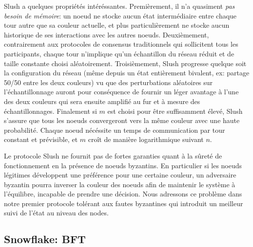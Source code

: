 \documentclass[letterpaper,twocolumn,10pt]{article}
\newcommand{\tronly}[2]{#1}
\theoremstyle{definition}
\begin{document}
Slush a quelques propriétés intéréssantes. Premièrement, il n'a quasiment \emph{pas besoin de mémoire}: un noeud ne
stocke aucun état intermédiaire entre chaque tour autre que sa couleur actuelle, et plus particulièrement ne stocke
aucun historique de ses interactions avec les autres noeuds. Deuxièmement, contrairement aux protocoles de consensus
traditionnels qui sollicitent tous les participants, chaque tour n'implique qu'un échantillon du réseau réduit et de
taille constante choisi aléatoirement. Troisièmement, Slush progresse quelque soit la configuration du réseau (même
depuis un état entièrement bivalent, ex: partage 50/50 entre les deux couleurs) vu que des perturbations aléatoires
sur l'échantillonnage auront pour conséquence de fournir un léger avantage à l'une des deux couleurs qui sera ensuite
amplifié au fur et à mesure des échantillonnages.
Finalement si $m$ est choisi pour être suffisamment élevé, Slush s'assure que tous les noeuds convergeront vers la
même couleur avec une haute probabilité. Chaque noeud nécéssite un temps de communication par tour constant et
prévisible, et $m$ croît de manière logarithmique suivant $n$.

\tronly{

Le protocole Slush ne fournit pas de fortes garanties quant à la sûreté de fonctionnement en la présence de noeuds
byzantins. En particulier si les noeuds légitimes développent une préférence pour une certaine couleur, un adversaire
byzantin pourra inverser la couleur des noeuds afin de maintenir le système à l'équilibre, incapable de prendre une
décision. Nous adressons ce problème dans notre premier protocole tolérant aux fautes byzantines qui introduit un
meilleur suivi de l'état au niveau des nodes.
}{
Nous examinons ensuite comment améliorer Slush pour être tolérant au problème des généraux byzantins.
}

\subsection{Snowflake: BFT}
\end{document}
